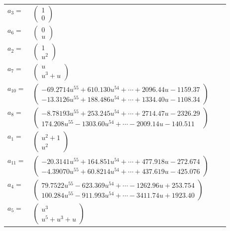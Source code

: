 \documentclass[1p]{elsarticle_modified}
\theoremstyle{definition}
\begin{document}
\begin{tabular}{m{7pt} m{180pt} m{7pt} m{180pt} }
\flushright $a_{3}=$&$\begin{pmatrix}1\\0\end{pmatrix}$ \\
\flushright $a_{6}=$&$\begin{pmatrix}0\\u\end{pmatrix}$ \\
\flushright $a_{2}=$&$\begin{pmatrix}1\\u^2\end{pmatrix}$ \\
\flushright $a_{7}=$&$\begin{pmatrix}u\\u^3+u\end{pmatrix}$ \\
\flushright $a_{10}=$&$\begin{pmatrix}-69.2714 u^{55}+610.130 u^{54}+\cdots+2096.44 u-1159.37\\-13.3126 u^{55}+188.486 u^{54}+\cdots+1334.40 u-1108.34\end{pmatrix}$ \\
\flushright $a_{8}=$&$\begin{pmatrix}-8.78193 u^{55}+253.245 u^{54}+\cdots+2714.47 u-2326.29\\174.208 u^{55}-1303.60 u^{54}+\cdots-2009.14 u-140.511\end{pmatrix}$ \\
\flushright $a_{1}=$&$\begin{pmatrix}u^2+1\\u^2\end{pmatrix}$ \\
\flushright $a_{11}=$&$\begin{pmatrix}-20.3141 u^{55}+164.851 u^{54}+\cdots+477.918 u-272.674\\-4.39070 u^{55}+60.8214 u^{54}+\cdots+437.619 u-425.076\end{pmatrix}$ \\
\flushright $a_{4}=$&$\begin{pmatrix}79.7522 u^{55}-623.369 u^{54}+\cdots-1262.96 u+253.754\\100.284 u^{55}-911.993 u^{54}+\cdots-3411.74 u+1923.40\end{pmatrix}$ \\
\flushright $a_{5}=$&$\begin{pmatrix}u^3\\u^5+u^3+u\end{pmatrix}$ \\

\end{tabular}
\end{document}
